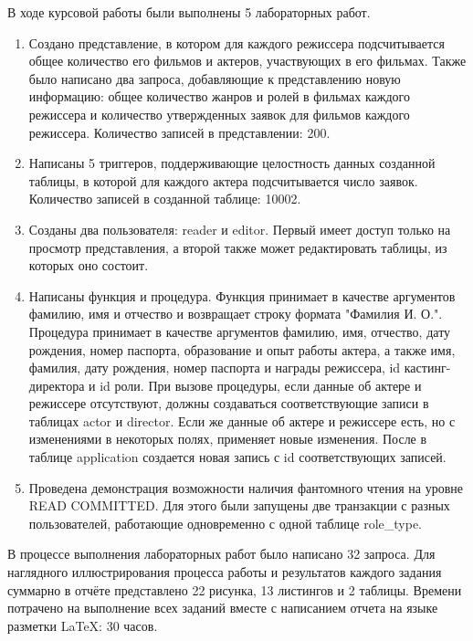 \documentclass[11pt,a4paper,final]{article} %
\begin{document}
В ходе курсовой работы были выполнены 5 лабораторных работ.
\begin{enumerate}
	\item Создано представление, в котором для каждого режиссера подсчитывается общее количество его фильмов и актеров, участвующих в его фильмах. Также было написано два запроса, добавляющие к представлению новую информацию: общее количество жанров и ролей в фильмах каждого режиссера и количество утвержденных заявок для фильмов каждого режиссера. Количество записей в представлении: 200. 
	
	\item Написаны 5 триггеров, поддерживающие целостность данных созданной таблицы, в которой для каждого актера подсчитывается число заявок. Количество записей в созданной таблице: 10002.
	
	\item Созданы два пользователя: reader и editor. Первый имеет доступ только на просмотр представления, а второй также может редактировать таблицы, из которых оно состоит.
	
	\item Написаны функция и процедура. Функция принимает в качестве аргументов фамилию, имя и отчество и возвращает строку формата "Фамилия И. О.". Процедура принимает в качестве аргументов фамилию, имя, отчество, дату рождения, номер паспорта, образование и опыт работы актера, а также имя, фамилия, дату рождения, номер паспорта и награды режиссера, id кастинг-директора и id роли. При вызове процедуры, если данные об актере и режиссере отсутствуют, должны создаваться соответствующие записи в таблицах actor и director. Если же данные об актере и режиссере есть, но с изменениями в некоторых полях, применяет новые изменения. После в таблице application создается новая запись с id соответствующих записей. 
	
	\item Проведена демонстрация возможности наличия фантомного чтения на уровне READ COMMITTED. Для этого были запущены две транзакции с разных пользователей, работающие одновременно с одной таблице role\_type.
	
\end{enumerate}

В процессе выполнения лабораторных работ было написано 32 запроса. Для наглядного иллюстрирования процесса работы и результатов каждого задания суммарно в отчёте представлено 22 рисунка, 13 листингов и 2 таблицы. Времени потрачено на выполнение всех заданий вместе с написанием отчета на языке разметки LaTeX: 30 часов. 
\end{document}
